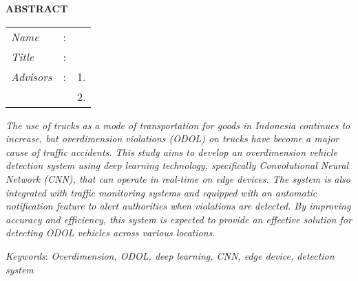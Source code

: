 \begin{center}
  \large\textbf{ABSTRACT}
\end{center}


\vspace{2ex}

\begingroup
\setlength{\tabcolsep}{0pt}

\noindent
\begin{tabularx}{\textwidth}{l >{\centering}m{3em} X}
  \emph{Name}     & : & \name{}         \\

  \emph{Title}    & : & \engtatitle{}   \\

  \emph{Advisors} & : & 1. \advisor{}   \\
                  &   & 2. \coadvisor{} \\
\end{tabularx}
\endgroup

\emph{The use of trucks as a mode of transportation for goods in Indonesia continues to increase, but overdimension violations (ODOL) on trucks have become a major cause of traffic accidents. This study aims to develop an overdimension vehicle detection system using deep learning technology, specifically Convolutional Neural Network (CNN), that can operate in real-time on edge devices. The system is also integrated with traffic monitoring systems and equipped with an automatic notification feature to alert authorities when violations are detected. By improving accuracy and efficiency, this system is expected to provide an effective solution for detecting ODOL vehicles across various locations}.

\emph{Keywords}: \emph{Overdimension, ODOL, deep learning, CNN, edge device, detection system}

